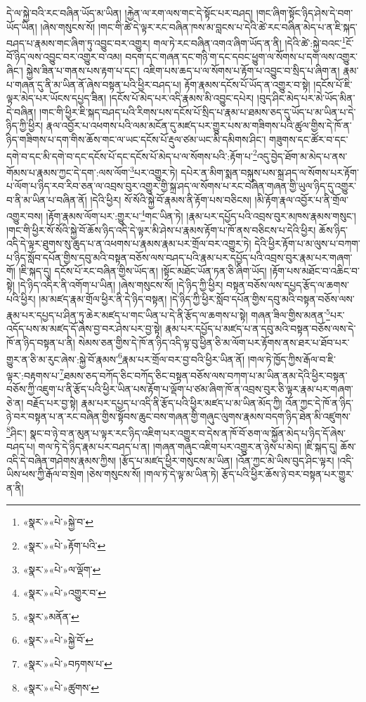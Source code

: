 དེ་ལ་སྐྱེ་བའི་རང་བཞིན་ཡོད་མ་ཡིན། །རྐྱེན་ལ་རག་ལས་གང་དེ་སྟོང་པར་བཤད། །གང་ཞིག་སྟོང་ཉིད་ཤེས་དེ་བག་ཡོད་ཡིན། །ཞེས་གསུངས་སོ། །གང་གི་ཚེ་དེ་ལྟར་རང་བཞིན་ཁས་མ་བླངས་པ་དེའི་ཚེ་རང་བཞིན་མེད་པ་ན་ཇི་སྐད་བཤད་པ་རྣམས་གང་ཞིག་ཏུ་འབྱུང་བར་འགྱུར། གལ་ཏེ་རང་བཞིན་འགའ་ཞིག་ཡོད་ན་ནི། །དེའི་ཚེ་:སྐྱེ་བའང་\footnote{«སྣར་»«པེ་»སྐྱེ་བ་}ངོ་བོ་ཉིད་ལས་འབྱུང་བར་འགྱུར་བ་འམ། བདག་དང་གཞན་དང་གཉི་ག་དང་དབང་ཕྱུག་ལ་སོགས་པ་དག་ལས་འགྱུར་ཞིང་། སྐྱེས་ཟིན་པ་གནས་པས་རྟག་པ་དང་། འཇིག་པས་ཆད་པ་ལ་སོགས་པ་རྟོག་པ་འབྱུང་བ་སྲིད་པ་ཞིག་ན། རྣམ་པ་གཞན་དུ་ནི་མ་ཡིན་ནོ་ཞེས་བསྟན་པའི་ཕྱིར་བཤད་པ། རྟོག་རྣམས་དངོས་པོ་ཡོད་ན་འགྱུར་བ་སྟེ། །དངོས་པོ་ཇི་ལྟར་མེད་པར་ཡོངས་དཔྱད་ཟིན། །དངོས་པོ་མེད་པར་འདི་རྣམས་མི་འབྱུང་དཔེར། །བུད་ཤིང་མེད་པར་མེ་ཡོད་མིན་དེ་བཞིན། །གང་གི་ཕྱིར་ཇི་སྐད་བཤད་པའི་རིགས་པས་དངོས་པོ་སྲིད་པ་རྣམ་པ་ཐམས་ཅད་དུ་ཡོད་པ་མ་ཡིན་པ་དེ་ཉིད་ཀྱི་ཕྱིར། རྣལ་འབྱོར་པ་འཕགས་པའི་ལམ་མངོན་དུ་མཛད་པར་གྱུར་པས་མ་གཟིགས་པའི་ཚུལ་གྱིས་དེ་ཁོ་ན་ཉིད་གཟིགས་པ་དག་གིས་ཆོས་གང་ལ་ཡང་དངོས་པོ་རྡུལ་ཙམ་ཡང་མི་དམིགས་ཤིང་། གཟུགས་དང་ཚོར་བ་དང་དགེ་བ་དང་མི་དགེ་བ་དང་དངོས་པོ་དང་དངོས་པོ་མེད་པ་ལ་སོགས་པའི་:རྟོག་པ་\footnote{«སྣར་»«པེ་»རྟོག་པའི་}འདུ་བྱེད་ཐོག་མ་མེད་པ་ནས་གོམས་པ་རྣམས་ཀྱང་དེ་དག་:ལས་ལོག་\footnote{«སྣར་»«པེ་»ལ་ལྡོག་}པར་འགྱུར་ཏེ། དཔེར་ན་མིག་སྨན་བསྐུས་པས་སྐྲ་ཤད་ལ་སོགས་པར་རྟོག་པ་ལོག་པ་ཉིད་རབ་རིབ་ཅན་ལ་འབྲས་བུར་འགྱུར་གྱི་སྐྲ་ཤད་ལ་སོགས་པ་རང་བཞིན་གཞན་གྱི་ཡུལ་ཉིད་དུ་འགྱུར་བ་ནི་མ་ཡིན་པ་བཞིན་ནོ། །དེའི་ཕྱིར། སོ་སོའི་སྐྱེ་བོ་རྣམས་ནི་རྟོག་པས་བཅིངས། །མི་རྟོག་རྣལ་འབྱོར་པ་ནི་གྲོལ་འགྱུར་བས། །རྟོག་རྣམས་ལོག་པར་:གྱུར་པ་\footnote{«སྣར་»«པེ་»འགྱུར་བ་}གང་ཡིན་ཏེ། །རྣམ་པར་དཔྱོད་པའི་འབྲས་བུར་མཁས་རྣམས་གསུང་། །གང་གི་ཕྱིར་སོ་སོའི་སྐྱེ་བོ་ཆོས་ཉིད་འདི་དེ་ལྟར་མི་ཤེས་པ་རྣམས་རྟོག་པ་ཁོ་ནས་བཅིངས་པ་དེའི་ཕྱིར། ཆོས་ཉིད་འདི་དེ་ལྟར་ཐུགས་སུ་ཆུད་པ་ན་འཕགས་པ་རྣམས་རྣམ་པར་གྲོལ་བར་འགྱུར་ཏེ། དེའི་ཕྱིར་རྟོག་པ་མ་ལུས་པ་བཀག་པ་ཉིད་སློབ་དཔོན་གྱིས་དབུ་མའི་བསྟན་བཅོས་ལས་བཤད་པའི་རྣམ་པར་དཔྱོད་པའི་འབྲས་བུར་རྣམ་པར་གཞག་གོ། །ཇི་སྐད་དུ། དངོས་པོ་རང་བཞིན་གྱིས་ཡོད་ན། །སྟོང་མཐོང་ཡོན་ཏན་ཅི་ཞིག་ཡོད། །རྟོག་པས་མཐོང་བ་འཆིང་བ་སྟེ། །དེ་ཉིད་འདིར་ནི་འགོག་པ་ཡིན། །ཞེས་གསུངས་སོ། །དེ་ཉིད་ཀྱི་ཕྱིར། བསྟན་བཅོས་ལས་དཔྱད་རྩོད་ལ་ཆགས་པའི་ཕྱིར། །མ་མཛད་རྣམ་གྲོལ་ཕྱིར་ནི་དེ་ཉིད་བསྟན། །དེ་ཉིད་ཀྱི་ཕྱིར་སློབ་དཔོན་གྱིས་དབུ་མའི་བསྟན་བཅོས་ལས་རྣམ་པར་དཔྱད་པ་ཤིན་ཏུ་ཆེར་མཛད་པ་གང་ཡིན་པ་དེ་ནི་རྩོད་ལ་ཆགས་པ་སྟེ། གཞན་ཟིལ་གྱིས་མནན་\footnote{«སྣར་»མནོན་}པར་འདོད་པས་མ་མཛད་དོ་ཞེས་བྱ་བར་ཤེས་པར་བྱ་སྟེ། རྣམ་པར་དཔྱོད་པ་མཛད་པ་ན་དབུ་མའི་བསྟན་བཅོས་ལས་དེ་ཁོ་ན་ཉིད་བསྟན་པ་ནི། སེམས་ཅན་གྱིས་དེ་ཁོ་ན་ཉིད་འདི་ལྟ་བུ་ཕྱིན་ཅི་མ་ལོག་པར་རྟོགས་ནས་ཐར་པ་ཐོབ་པར་གྱུར་ན་ཅི་མ་རུང་ཞེས་:སྐྱེ་བོ་རྣམས་\footnote{«སྣར་»«པེ་»སྐྱེ་བོ་}རྣམ་པར་གྲོལ་བར་བྱ་བའི་ཕྱིར་ཡིན་ནོ། །གལ་ཏེ་ཁྱོད་ཀྱིས་རྒོལ་བ་ཇི་ལྟར་:བརྟགས་པ་\footnote{«སྣར་»«པེ་»བཏགས་པ་}ཐམས་ཅད་བཀོད་ཅིང་བཀོད་ཅིང་བསྟན་བཅོས་ལས་བཀག་པ་མ་ཡིན་ནམ་དེའི་ཕྱིར་བསྟན་བཅོས་ཀྱི་འཇུག་པ་ནི་རྩོད་པའི་ཕྱིར་ཡིན་པས་རྟོག་པ་ལྡོག་པ་ཙམ་ཞིག་ཁོ་ན་འབྲས་བུར་ཅི་ལྟར་རྣམ་པར་གཞག་ཅེ་ན། བརྗོད་པར་བྱ་སྟེ། རྣམ་པར་དཔྱད་པ་འདི་ནི་རྩོད་པའི་ཕྱིར་མཛད་པ་མ་ཡིན་མོད་ཀྱི། འོན་ཀྱང་དེ་ཁོ་ན་ཉིད་ཉེ་བར་བསྟན་པ་ན་རང་བཞིན་གྱིས་སྟོབས་ཆུང་བས་གཞན་གྱི་གཞུང་ལུགས་རྣམས་བདག་ཉིད་ཐེན་མི་འཛུགས་\footnote{«སྣར་»«པེ་»ཚུགས་}ཤིང་། སྣང་བ་ཉེ་བ་ན་མུན་པ་ལྟར་རང་ཉིད་འཇིག་པར་འགྱུར་བ་དེས་ན་ཁོ་བོ་ཅག་ལ་སྐྱོན་མེད་པ་ཉིད་དོ་ཞེས་བཤད་པ། གལ་ཏེ་དེ་ཉིད་རྣམ་པར་བཤད་པ་ན། །གཞན་གཞུང་འཇིག་པར་འགྱུར་ན་ཉེས་པ་མེད། །ཇི་སྐད་དུ། ཆོས་འདི་དེ་བཞིན་གཤེགས་རྣམས་ཀྱིས། །རྩོད་པ་མཛད་ཕྱིར་གསུངས་མ་ཡིན། །འོན་ཀྱང་མེ་ཡིས་བུད་ཤིང་ལྟར། །འདི་ཡིས་ཕས་ཀྱི་རྒོལ་བ་སྲེག །ཅེས་གསུངས་སོ། །གལ་ཏེ་དེ་ལྟ་མ་ཡིན་ཏེ། རྩོད་པའི་ཕྱིར་ཆོས་ཉེ་བར་བསྟན་པར་གྱུར་ན་ནི། 